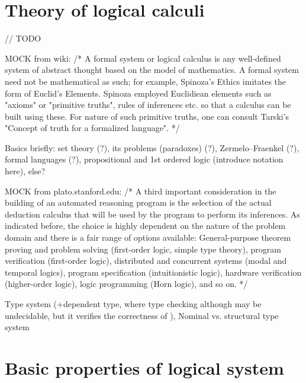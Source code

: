 \documentclass[article]{aaltoseries}
\begin{document}

\section{Theory of logical calculi}
\label{sec:formal_theory}

// TODO

MOCK from wiki: /* A formal system or logical calculus is any well-defined system of abstract thought based on the model of mathematics. A formal system need not be mathematical as such; for example, Spinoza's Ethics imitates the form of Euclid's Elements. Spinoza employed Euclidiean elements such as "axioms" or "primitive truths", rules of inferences etc. so that a calculus can be built using these. For nature of such primitive truths, one can consult Tarski's "Concept of truth for a formalized language".
*/

Basics briefly: set theory (?), its problems (paradoxes) (?), Zermelo–Fraenkel (?), formal languages (?), propositional and 1st ordered logic (introduce notation here), else?


MOCK from plato.stanford.edu:  %
/* A third important consideration in the building of an automated reasoning program is the selection of the actual deduction calculus that will be used by the program to perform its inferences. As indicated before, the choice is highly dependent on the nature of the problem domain and there is a fair range of options available: General-purpose theorem proving and problem solving (first-order logic, simple type theory), program verification (first-order logic), distributed and concurrent systems (modal and temporal logics), program specification (intuitionistic logic), hardware verification (higher-order logic), logic programming (Horn logic), and so on.
*/

Type system (+dependent type, where type checking although may be undecidable, but it verifies the correctness of ), Nominal vs. structural type system


\section{Basic properties of logical system}
\label{sec:logic_properties}
\end{document}
